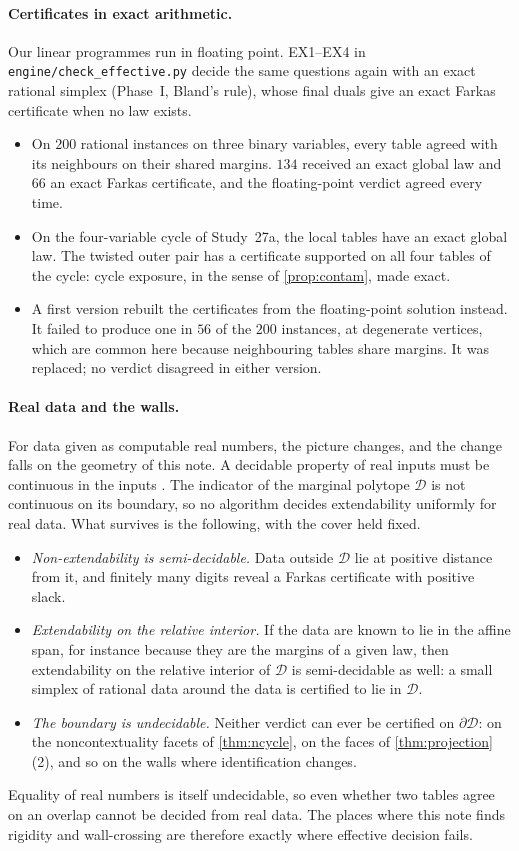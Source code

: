 \documentclass[11pt]{article}
\theoremstyle{definition}\newtheorem{definition}[theorem]{Definition}\newtheorem{remark}[theorem]{Remark}\newtheorem{example}[theorem]{Example}\newtheorem{problem}[theorem]{Open problem}\crefname{problem}{Problem}{Problems}
\begin{document}
\paragraph{Certificates in exact arithmetic.} Our linear programmes run in floating point. EX1--EX4 in \texttt{engine/check\_effective.py} decide the same questions again with an exact rational simplex (Phase~I, Bland's rule), whose final duals give an exact Farkas certificate when no law exists.
\begin{itemize}
\item On $200$ rational instances on three binary variables, every table agreed with its neighbours on their shared margins. $134$ received an exact global law and $66$ an exact Farkas certificate, and the floating-point verdict agreed every time.
\item On the four-variable cycle of Study~27a, the local tables have an exact global law. The twisted outer pair has a certificate supported on all four tables of the cycle: cycle exposure, in the sense of \cref{prop:contam}, made exact.
\item A first version rebuilt the certificates from the floating-point solution instead. It failed to produce one in $56$ of the $200$ instances, at degenerate vertices, which are common here because neighbouring tables share margins. It was replaced; no verdict disagreed in either version.
\end{itemize}

\paragraph{Real data and the walls.} For data given as computable real numbers, the picture changes, and the change falls on the geometry of this note. A decidable property of real inputs must be continuous in the inputs \cite{Weihrauch2000}. The indicator of the marginal polytope $\mathcal D$ is not continuous on its boundary, so no algorithm decides extendability uniformly for real data. What survives is the following, with the cover held fixed.
\begin{itemize}
\item \emph{Non-extendability is semi-decidable.} Data outside $\mathcal D$ lie at positive distance from it, and finitely many digits reveal a Farkas certificate with positive slack.
\item \emph{Extendability on the relative interior.} If the data are known to lie in the affine span, for instance because they are the margins of a given law, then extendability on the relative interior of $\mathcal D$ is semi-decidable as well: a small simplex of rational data around the data is certified to lie in $\mathcal D$.
\item \emph{The boundary is undecidable.} Neither verdict can ever be certified on $\partial\mathcal D$: on the noncontextuality facets of \cref{thm:ncycle}, on the faces of \cref{thm:projection}(2), and so on the walls where identification changes.
\end{itemize}
Equality of real numbers is itself undecidable, so even whether two tables agree on an overlap cannot be decided from real data. The places where this note finds rigidity and wall-crossing are therefore exactly where effective decision fails.
\end{document}
